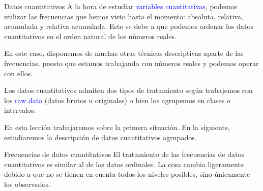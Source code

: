 \documentclass[
  ignorenonframetext,
  aspectratio=169]{beamer}
\newcommand\blue[1]{\textcolor{blue}{#1}}
\begin{document}
\begin{frame}{Datos cuantitativos}
\label{datos-cuantitativos-1}
A la hora de estudiar \blue{variables cuantitativas}, podemos utilizar
las frecuencias que hemos visto hasta el momento: absoluta, relativa,
acumulada y relativa acumulada. Esto se debe a que podemos ordenar los
datos cuantitativos en el orden natural de los números reales.

En este caso, disponemos de muchas otras técnicas descriptivas aparte de
las frecuencias, puesto que estamos trabajando con números reales y
podemos operar con ellos.

Los datos cuantitativos admiten dos tipos de tratamiento según
trabajemos con los \blue{raw data} (datos brutos u originales) o bien
los agrupemos en clases o intervalos.

En esta lección trabajaremos sobre la primera situación. En la
siguiente, estudiaremos la descripción de datos cuantitativos agrupados.
\end{frame}

\begin{frame}{Frecuencias de datos cuantitativos}
\label{frecuencias-de-datos-cuantitativos}
El tratamiento de las frecuencias de datos cuantitativos es similar al
de los datos ordinales. La cosa cambia ligeramente debido a que no se
tienen en cuenta todos los niveles posibles, sino únicamente los
observados.
\end{frame}
\end{document}
